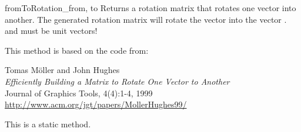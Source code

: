 \begin{methoddesc}{fromToRotation}{_from, to}
Returns a rotation matrix that rotates one vector into another.
The generated rotation matrix will rotate the vector  into the
vector .  and  must be unit vectors!

This method is based on the code from:

Tomas M\"oller and John Hughes\\
{\em Efficiently Building a Matrix to Rotate One Vector to Another}\\
Journal of Graphics Tools, 4(4):1-4, 1999\\
\url{http://www.acm.org/jgt/papers/MollerHughes99/}

This is a static method.
\end{methoddesc}
